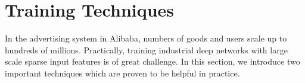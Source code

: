 
 


\section{Training Techniques}
In the advertising system in Alibaba, numbers of goods and users scale up to hundreds of millions.  
Practically, training industrial deep networks with large scale sparse input features is of great challenge.
In this section, we introduce two important techniques which are proven to be helpful in practice. 


